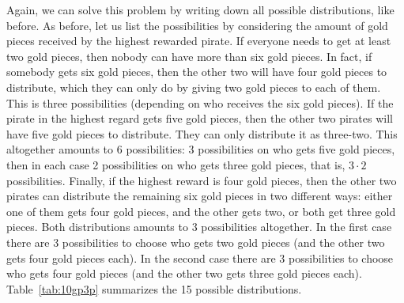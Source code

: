 Again, we can solve this problem by writing down all possible distributions, like before. 
As before, let us list the possibilities by considering the amount of gold pieces received by the highest rewarded pirate. 
If everyone needs to get at least two gold pieces, then nobody can have more than six gold pieces. 
In fact, if somebody gets six gold pieces, 
then the other two will have four gold pieces to distribute, 
which they can only do by giving two gold pieces to each of them. 
This is three possibilities (depending on who receives the six gold pieces). 
If the pirate in the highest regard gets five gold pieces, 
then the other two pirates will have five gold pieces to distribute. 
They can only distribute it as three-two. 
This altogether amounts to 6 possibilities: 3 possibilities on who gets five gold pieces, 
then in each case 2 possibilities on who gets three gold pieces, 
that is, $3 \cdot 2$ possibilities. 
Finally, if the highest reward is four gold pieces, 
then the other two pirates can distribute the remaining six gold pieces in two different ways: 
either one of them gets four gold pieces, and the other gets two, 
or both get three gold pieces. 
Both distributions amounts to 3 possibilities altogether. 
In the first case there are 3 possibilities to choose who gets two gold pieces (and the other two gets four gold pieces each). 
In the second case there are 3 possibilities to choose who gets four gold pieces (and the other two gets three gold pieces each). 
Table~\ref{tab:10gp3p} summarizes the 15 possible distributions. 

